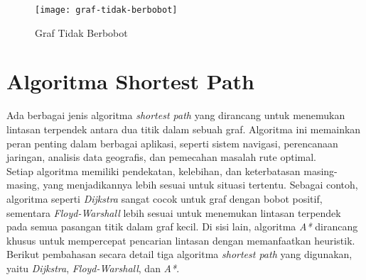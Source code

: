 \begin{figure}[H] 
    \centering  
    \texttt{[image: graf-tidak-berbobot]}  
    \caption{Graf Tidak Berbobot}
    \label{fig:graftidakberbobot} 
\end{figure}
\newpage
\section{Algoritma Shortest Path}
\label{sec:algoritmasp}
Ada berbagai jenis algoritma \textit{shortest path} yang dirancang untuk menemukan lintasan terpendek antara dua titik dalam sebuah graf. Algoritma ini memainkan peran penting dalam berbagai aplikasi, seperti sistem navigasi, perencanaan jaringan, analisis data geografis, dan pemecahan masalah rute optimal.
\\
Setiap algoritma memiliki pendekatan, kelebihan, dan keterbatasan masing-masing, yang menjadikannya lebih sesuai untuk situasi tertentu. Sebagai contoh, algoritma seperti \textit{Dijkstra} sangat cocok untuk graf dengan bobot positif, sementara \textit{Floyd-Warshall} lebih sesuai untuk menemukan lintasan terpendek pada semua pasangan titik dalam graf kecil. Di sisi lain, algoritma \textit{A*} dirancang khusus untuk mempercepat pencarian lintasan dengan memanfaatkan heuristik. Berikut pembahasan secara detail tiga algoritma \textit{shortest path} yang digunakan, yaitu \textit{Dijkstra}, \textit{Floyd-Warshall}, dan \textit{A*}.

